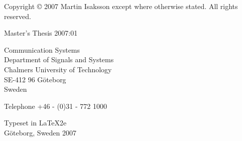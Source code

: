\clearpage\noindent\pagestyle{empty}\thesistitle

Copyright \copyright{} 2007 Martin Isaksson except where otherwise stated. All rights reserved.

Master's Thesis 2007:01

\vfill

Communication Systems \\
Department of Signals and Systems \\
Chalmers University of Technology  \\
SE-412 96 G\"{o}teborg  \\
Sweden

Telephone +46 - (0)31 - 772 1000

\vspace{1 cm}


\vspace{1 cm}
Typeset in \LaTeX2e\\
G\"{o}teborg, Sweden 2007
